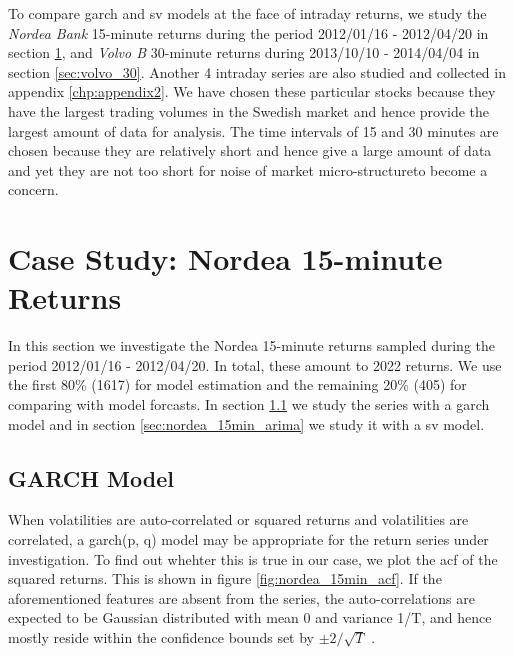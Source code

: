 To compare \gls{garch} and \gls{sv} models at the face of intraday returns,
we study the {\it Nordea Bank} 15-minute returns during the period
2012/01/16 - 2012/04/20 in section \ref{chp:nordea_15min}, 
and {\it Volvo B} 30-minute returns during 2013/10/10 - 2014/04/04 in
section \ref{sec:volvo_30}. Another 4 intraday series are also studied and
collected in appendix \ref{chp:appendix2}. We have chosen these
particular stocks because they have the largest trading volumes in the
Swedish market and hence provide the largest amount of data for
analysis. The time intervals of 15 and 30 minutes are chosen because
they are relatively short and hence give a large amount of data and
yet they are not too short for noise of market
micro-structure\footnotemark to become a concern.

\section{Case Study: Nordea 15-minute Returns}
\label{chp:nordea_15min}
In this section we investigate the Nordea 15-minute returns sampled
during the period 2012/01/16 - 2012/04/20. In total, these amount to
2022 returns. We use the first 80\% (1617) for model estimation and  the
remaining 20\% (405) for comparing with model forcasts. In section
\ref{sec:nordea_15min_garch} we study the series with a \gls{garch} model 
and in section \ref{sec:nordea_15min_arima} we study it with a
\gls{sv} model.

\subsection{GARCH Model}\label{sec:nordea_15min_garch}
When volatilities are auto-correlated or squared returns and
volatilities are correlated, a \gls{garch}(p, q) model may be
appropriate for the return series under investigation. To find out
whehter this is true in our case, we plot the \gls{acf} of the squared
returns. This is shown in figure \ref{fig:nordea_15min_acf}. If the
aforementioned features are absent from the series, the
auto-correlations are expected to be Gaussian distributed with mean 0
and variance 1/T, and hence mostly reside within the confidence bounds
set by $\pm 2/\sqrt{T}$ \cite{Bollerslev86, Bollerslev87}.


